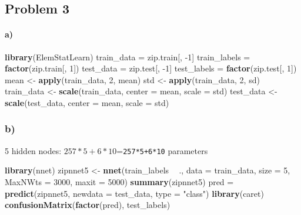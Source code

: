 \documentclass[]{article}
\newenvironment{Shaded}{\begin{snugshade}}{\end{snugshade}}
\newcommand{\DataTypeTok}[1]{\textcolor[rgb]{0.13,0.29,0.53}{#1}}
\newcommand{\DecValTok}[1]{\textcolor[rgb]{0.00,0.00,0.81}{#1}}
\newcommand{\KeywordTok}[1]{\textcolor[rgb]{0.13,0.29,0.53}{\textbf{#1}}}
\newcommand{\NormalTok}[1]{#1}
\newcommand{\OperatorTok}[1]{\textcolor[rgb]{0.81,0.36,0.00}{\textbf{#1}}}
\newcommand{\StringTok}[1]{\textcolor[rgb]{0.31,0.60,0.02}{#1}}
\let\oldparagraph\paragraph
\renewcommand{\paragraph}[1]{\oldparagraph{#1}\mbox{}}
\begin{document}
\hypertarget{problem-3}{%
\subsection{Problem 3}\label{problem-3}}

\hypertarget{a-2}{%
\paragraph{a)}\label{a-2}}

\begin{Shaded}
\begin{Highlighting}[]
\KeywordTok{library}\NormalTok{(ElemStatLearn)}
\NormalTok{train_data =}\StringTok{ }\NormalTok{zip.train[, }\DecValTok{-1}\NormalTok{]}
\NormalTok{train_labels =}\StringTok{ }\KeywordTok{factor}\NormalTok{(zip.train[, }\DecValTok{1}\NormalTok{])}
\NormalTok{test_data =}\StringTok{ }\NormalTok{zip.test[, }\DecValTok{-1}\NormalTok{]}
\NormalTok{test_labels =}\StringTok{ }\KeywordTok{factor}\NormalTok{(zip.test[, }\DecValTok{1}\NormalTok{])}
\NormalTok{mean <-}\StringTok{ }\KeywordTok{apply}\NormalTok{(train_data, }\DecValTok{2}\NormalTok{, mean)}
\NormalTok{std <-}\StringTok{ }\KeywordTok{apply}\NormalTok{(train_data, }\DecValTok{2}\NormalTok{, sd)}
\NormalTok{train_data <-}\StringTok{ }\KeywordTok{scale}\NormalTok{(train_data, }\DataTypeTok{center =}\NormalTok{ mean, }\DataTypeTok{scale =}\NormalTok{ std)}
\NormalTok{test_data <-}\StringTok{ }\KeywordTok{scale}\NormalTok{(test_data, }\DataTypeTok{center =}\NormalTok{ mean, }\DataTypeTok{scale =}\NormalTok{ std)}
\end{Highlighting}
\end{Shaded}

\hypertarget{b-2}{%
\subsubsection{b)}\label{b-2}}

5 hidden nodes: \(257*5+6*10\)=\texttt{257*5+6*10} parameters

\begin{Shaded}
\begin{Highlighting}[]
\KeywordTok{library}\NormalTok{(nnet)}
\NormalTok{zipnnet5 <-}\StringTok{ }\KeywordTok{nnet}\NormalTok{(train_labels }\OperatorTok{~}\StringTok{ }\NormalTok{., }\DataTypeTok{data =}\NormalTok{ train_data, }\DataTypeTok{size =} \DecValTok{5}\NormalTok{, }\DataTypeTok{MaxNWts =} \DecValTok{3000}\NormalTok{, }
    \DataTypeTok{maxit =} \DecValTok{5000}\NormalTok{)}
\KeywordTok{summary}\NormalTok{(zipnnet5)}
\NormalTok{pred =}\StringTok{ }\KeywordTok{predict}\NormalTok{(zipnnet5, }\DataTypeTok{newdata =}\NormalTok{ test_data, }\DataTypeTok{type =} \StringTok{"class"}\NormalTok{)}
\KeywordTok{library}\NormalTok{(caret)}
\KeywordTok{confusionMatrix}\NormalTok{(}\KeywordTok{factor}\NormalTok{(pred), test_labels)}
\end{Highlighting}
\end{Shaded}
\end{document}

